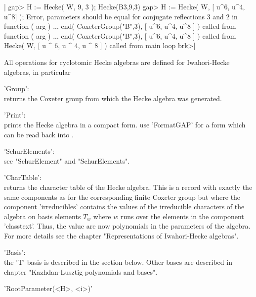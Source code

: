 |    gap> H := Hecke( W, 9, 3 );
    Hecke(B3,9,3)
    gap> H := Hecke( W, [ u^6, u^4, u^8] );
    Error, parameters should be equal for conjugate reflections 3 and 2 in
    function ( arg ) ... end( CoxeterGroup("B",3), [ u^6, u^4, u^8 ]
     ) called from
    function ( arg ) ... end( CoxeterGroup("B",3), [ u^6, u^4, u^8 ]
     ) called from
    Hecke( W, [ u ^ 6, u ^ 4, u ^ 8 ] ) called from
    main loop
    brk>|


All operations for cyclotomic Hecke algebras are defined for Iwahori-Hecke
algebras, in particular \:

'Group':\\  returns the Coxeter  group from which  the  Hecke algebra was
     generated.

'Print':\\  prints the Hecke algebra in a compact form. use 'FormatGAP' for
     a form which can be read back into \GAP.

'SchurElements':\\   see  "SchurElement" and "SchurElements".

'CharTable':\\ returns the character table  of the Hecke algebra. This is
     a record with  exactly the same  components as for the corresponding
     finite Coxeter group but where the component 'irreducibles' contains
     the values  of the irreducible characters   of the algebra  on basis
     elements $T_w$ where  $w$ runs  over  the elements in the  component
     'classtext'. Thus, the value  are now polynomials in the  parameters
     of the algebra.  For  more details see the  chapter "Representations
     of Iwahori-Hecke algebras".

'Basis':\\ the 'T' basis is described in  the section below.  Other bases
     are described in chapter "Kazhdan-Lusztig polynomials and bases".


'RootParameter(<H>, <i>)'

